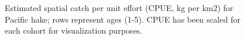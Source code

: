 \documentclass[
]{article}
\begin{document}
\begin{figure}


\caption{\label{fig-hake-spatial-composition-all}Estimated spatial catch
per unit effort (CPUE, kg per km2) for Pacific hake; rows represent ages
(1-5). CPUE has been scaled for each cohort for visualization purposes.}

\end{figure}%

\newpage
\end{document}
